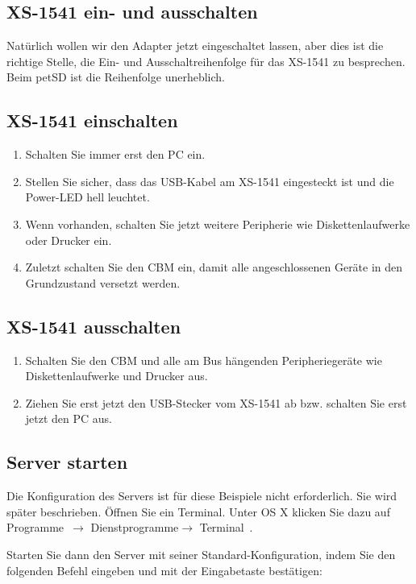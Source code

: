 \documentclass[10pt,a4paper]{scrartcl}		%
\begin{document}
\subsection{XS-1541 ein- und ausschalten}
Natürlich wollen wir den Adapter jetzt eingeschaltet lassen, aber dies
ist die richtige Stelle, die Ein- und Ausschaltreihenfolge für das
XS-1541 zu besprechen. Beim petSD ist die Reihenfolge unerheblich.

\subsection*{XS-1541 einschalten}
\begin{enumerate}
\item Schalten Sie immer erst den PC ein. 
\item Stellen Sie sicher, dass das USB-Kabel am XS-1541 eingesteckt ist und 
die Power-LED hell leuchtet.
\item Wenn vorhanden, schalten Sie jetzt weitere Peripherie wie 
Diskettenlaufwerke oder Drucker ein.
\item Zuletzt schalten Sie den CBM ein, damit alle angeschlossenen
Geräte in den Grundzustand versetzt werden.
\end{enumerate}

\subsection*{XS-1541 ausschalten}
\begin{enumerate}
\item Schalten Sie den CBM und alle am Bus hängenden Peripheriegeräte
wie Diskettenlaufwerke und Drucker aus.
\item Ziehen Sie erst jetzt den USB-Stecker vom XS-1541 ab bzw.
schalten Sie erst jetzt den PC aus.
\end{enumerate}

\subsection{Server starten}

Die Konfiguration des Servers ist für diese Beispiele nicht erforderlich.
Sie wird später beschrieben.
Öffnen Sie ein Terminal. Unter OS X klicken Sie dazu auf \glqq Programme\grqq\  
$\to$ \glqq Dienstprogramme\grqq $\to$ \glqq Terminal\grqq\ .

Starten Sie dann den Server mit seiner Standard-Konfiguration, indem Sie
den folgenden Befehl eingeben und mit der Eingabetaste bestätigen:
\end{document}
